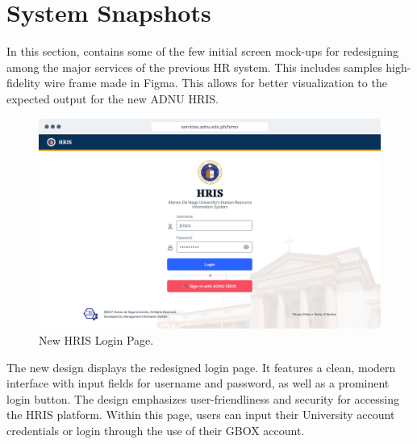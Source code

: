 \section{System Snapshots}

In this section, contains some of the few initial screen mock-ups for redesigning among the major services of the previous HR system. This includes samples high-fidelity wire frame made in Figma. This allows for better visualization to the expected output for the new ADNU HRIS.

    \begin{figure}[H]
        \centering
        \includegraphics[width=1\linewidth]{figures/app/login.png}
        \caption{New HRIS Login Page.}
        \label{fig:app-login}
    \end{figure}

    The new design displays the redesigned login page. It features a clean, modern interface with input fields for username and password, as well as a prominent login button. The design emphasizes user-friendliness and security for accessing the HRIS platform. Within this page, users can input their University account credentials or login through the use of their GBOX account.

